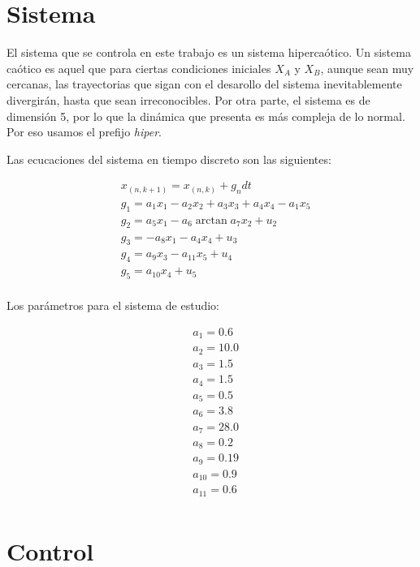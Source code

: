 \documentclass[DIV=20]{scrartcl}
\begin{document}
\section{Sistema}

El sistema que se controla en este trabajo es un sistema hipercaótico. Un
sistema caótico es aquel que para ciertas condiciones iniciales $X_A$ y $X_B$,
aunque sean muy cercanas, las trayectorias que sigan con el desarollo del
sistema inevitablemente divergirán, hasta que sean irreconocibles.
Por otra parte, el sistema es de dimensión 5, por lo que la dinámica que
presenta es más compleja de lo normal. Por eso usamos el prefijo \emph{hiper}.

Las ecucaciones del sistema en tiempo discreto son las siguientes:


\begin{align*}
	 & x_{(n, k+1)} = x_{(n, k)} + g_n  dt                   \\
	 & g_1 = a_1 x_1 - a_2 x_2 + a_3 x_3 + a_4 x_4 - a_1 x_5 \\
	 & g_2 = a_5 x_1 - a_6 \arctan{a_7 x_2} + u_2            \\
	 & g_3 = - a_8 x_1 - a_4 x_4 + u_3                       \\
	 & g_4 = a_9 x_3 - a_{11} x_5 + u_4                      \\
	 & g_5 = a_{10} x _4 + u_5                               \\
\end{align*}

Los parámetros para el sistema de estudio:

\begin{align*}
	 & a_1 = 0.6    \\
	 & a_2 = 10.0   \\
	 & a_3 = 1.5    \\
	 & a_4 = 1.5    \\
	 & a_5 = 0.5    \\
	 & a_6 = 3.8    \\
	 & a_7 = 28.0   \\
	 & a_8 = 0.2    \\
	 & a_9 = 0.19   \\
	 & a_{10} = 0.9 \\
	 & a_{11} = 0.6 \\
\end{align*}

\section{Control}
\end{document}
